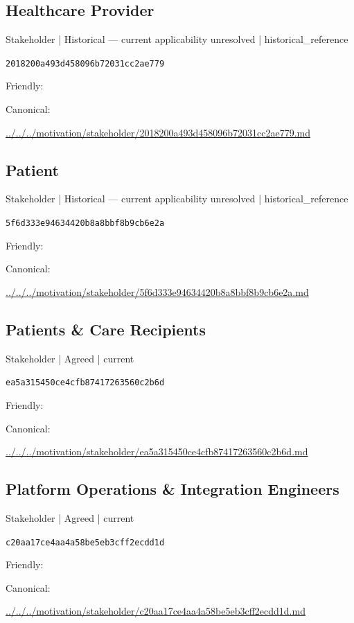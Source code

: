 \documentclass[10pt,a4paper]{article}
\begin{document}
\subsection*{Healthcare Provider}
{\small Stakeholder | Historical — current applicability unresolved | historical\_reference}\par
\texttt{2018200a493d458096b72031cc2ae779}\par
Friendly: \par
Canonical: \par
{\footnotesize\url{../../../motivation/stakeholder/2018200a493d458096b72031cc2ae779.md}}\par
\subsection*{Patient}
{\small Stakeholder | Historical — current applicability unresolved | historical\_reference}\par
\texttt{5f6d333e94634420b8a8bbf8b9cb6e2a}\par
Friendly: \par
Canonical: \par
{\footnotesize\url{../../../motivation/stakeholder/5f6d333e94634420b8a8bbf8b9cb6e2a.md}}\par
\subsection*{Patients \& Care Recipients}
{\small Stakeholder | Agreed | current}\par
\texttt{ea5a315450ce4cfb87417263560c2b6d}\par
Friendly: \par
Canonical: \par
{\footnotesize\url{../../../motivation/stakeholder/ea5a315450ce4cfb87417263560c2b6d.md}}\par
\subsection*{Platform Operations \& Integration Engineers}
{\small Stakeholder | Agreed | current}\par
\texttt{c20aa17ce4aa4a58be5eb3cff2ecdd1d}\par
Friendly: \par
Canonical: \par
{\footnotesize\url{../../../motivation/stakeholder/c20aa17ce4aa4a58be5eb3cff2ecdd1d.md}}\par
\end{document}
